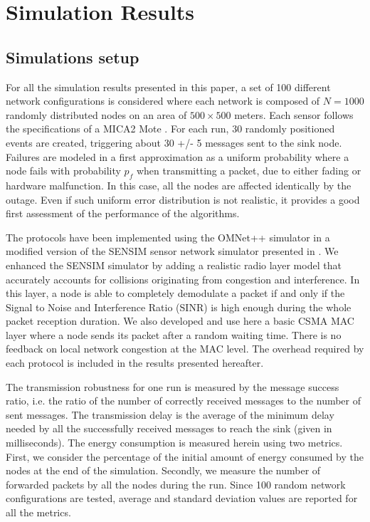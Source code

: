 \documentclass[journal, peerreview, onecolumn, draftcls]{IEEEtran}
\begin{document}
\section{Simulation Results}\label{sec:results}

\subsection{Simulations setup}\label{subsec:simSetup}
For all the simulation results presented in this paper, a set of 100 different network configurations is considered where each network is composed of $N=1000$ randomly distributed nodes on an area of $500\times500$ meters.
Each sensor follows the specifications of a MICA2 Mote \cite{Mica2}. For each run, 30 randomly positioned events are created, triggering about 30 +/- 5 messages sent to the sink node.
Failures are modeled in a first approximation as a uniform probability where a node fails with probability $p_f$ when transmitting a packet, due to either fading or hardware malfunction. In this case, all the nodes are affected identically by the outage. Even if such uniform error distribution is not realistic, it provides a good first assessment of the performance of the algorithms.

The protocols have been implemented using the OMNet++ simulator in a modified version of the SENSIM sensor network simulator presented in \cite{LSUsimulator}. We enhanced the SENSIM simulator by adding a realistic radio layer model that accurately accounts for collisions originating from congestion and interference. In this layer, a node is able to completely demodulate a packet if and only if the Signal to Noise and Interference Ratio (SINR) is high enough during the whole packet reception duration. We also developed and use here a basic CSMA MAC layer where a node sends its packet after a random waiting time. There is no feedback on local network congestion at the MAC level. The overhead required by each protocol is included in the results presented hereafter.

The transmission robustness for one run is measured by the message success ratio, i.e. the ratio of the number of correctly received messages to the number of sent messages. The transmission delay is the average of the minimum delay needed by all the successfully received messages to reach the sink (given in milliseconds). The energy consumption is measured herein using two metrics. First, we consider the percentage of the initial amount of energy consumed by the nodes at the end of the simulation. Secondly, we measure the number of forwarded packets by all the nodes during the run. Since 100 random network configurations are tested, average and standard deviation values are reported for all the metrics.
\end{document}

